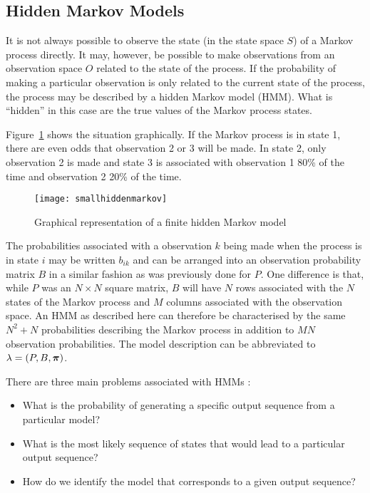\subsection{Hidden Markov Models} 
It is not always possible to observe the state (in the state space
$S$) of a Markov process directly. It may, however, be possible to
make observations from an observation space $O$ related to the state
of the process. If the probability of making a particular observation
is only related to the current state of the process, the process may
be described by a hidden Markov model (HMM). What is ``hidden'' in
this case are the true values of the Markov process states.

Figure~\ref{fig:hiddenmarkov} shows the situation graphically. If the
Markov process is in state 1, there are even odds that observation 2
or 3 will be made. In state 2, only observation 2 is made and state 3
is associated with observation 1 80\% of the time and observation 2
20\% of the time.

\begin{figure}[htbp]
  \centering
  \texttt{[image: smallhiddenmarkov]}
  \caption{Graphical representation of a finite hidden Markov model}
  \label{fig:hiddenmarkov}
\end{figure}

The probabilities associated with a observation $k$ being made when
the process is in state $i$ may be written $b_{ik}$ and can be
arranged into an observation probability matrix $B$ in a similar
fashion as was previously done for $P$. One difference is that, while
$P$ was an $N \times N$ square matrix, $B$ will have $N$ rows
associated with the $N$ states of the Markov process and $M$ columns
associated with the observation space. An HMM as described here can
therefore be characterised by the same $N^2+N$ probabilities describing
the Markov process in addition to $MN$ observation probabilities.  The
model description can be abbreviated to $\lambda = (P, B, \boldsymbol{\pi})$.

There are three main problems associated with HMMs \citep{gamerman_markov_2006}:
\begin{itemize}
\item What is the probability of generating a specific output sequence
  from a particular model?
\item What is the most likely sequence of states that would lead to a
  particular output sequence?
\item How do we identify the model that corresponds to a given output
  sequence?
\end{itemize}

